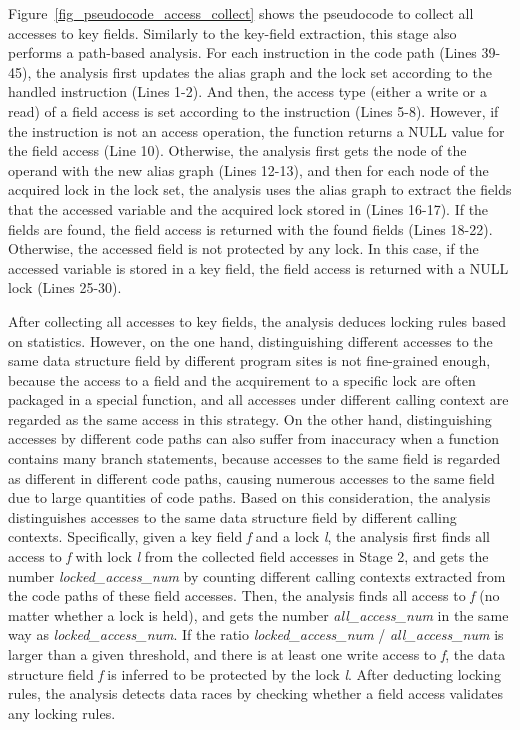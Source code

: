 Figure~\ref{fig_pseudocode_access_collect} shows the pseudocode to collect all 
accesses to key fields. Similarly to the key-field extraction, this stage also 
performs a path-based analysis. For each instruction in the code path (Lines 
39-45), the analysis first updates the alias graph and the lock set according 
to the handled instruction (Lines 1-2). And then, the access type (either a 
write or a read) of a field access is set according to the instruction (Lines 
5-8). However, if the instruction is not an access operation, the function 
returns a NULL value for the field access (Line 10). Otherwise, the analysis 
first gets the node of the operand with the new alias graph (Lines 12-13), and 
then for each node of the acquired lock in the lock set, the analysis uses the 
alias graph to extract the fields that the accessed variable and the acquired 
lock stored in (Lines 16-17). If the fields are found, the field access is 
returned with the found fields (Lines 18-22). Otherwise, the accessed field is 
not protected by any lock. In this case, if the accessed variable is stored in 
a key field, the field access is returned with a NULL lock (Lines 25-30).

 After collecting all accesses to key fields, 
the analysis deduces locking rules based on statistics. However, on the one 
hand, distinguishing different accesses to the same data structure field by 
different program sites is not fine-grained enough, because the access to a 
field and the acquirement to a specific lock are often packaged in a special 
function, and all accesses under different calling context are regarded as the 
same access in this strategy. On the other hand, distinguishing accesses by 
different code paths can also suffer from inaccuracy when a function contains 
many branch statements, because accesses to the same field is regarded as 
different in different code paths, causing numerous accesses to the same field 
due to large quantities of code paths. Based on this consideration, the 
analysis distinguishes accesses to the same data structure field by different 
calling contexts. Specifically, given a key field {\em f} and a lock {\em l}, 
the analysis first finds all access to {\em f} with lock {\em l} from the 
collected field accesses in Stage 2, and gets the number {\em 
locked\_access\_num} by counting different calling contexts extracted from the 
code paths of these field accesses. Then, the analysis finds all access to {\em 
f} (no matter whether a lock is held), and gets the number {\em 
all\_access\_num} in the same way as {\em locked\_access\_num}. If the ratio 
{\em locked\_access\_num} / {\em all\_access\_num} is larger than a given 
threshold, and there is at least one write access to {\em f}, the data 
structure field {\em f} is inferred to be protected by the lock {\em l}. After 
deducting locking rules, the analysis detects data races by checking whether a 
field access validates any locking rules.

